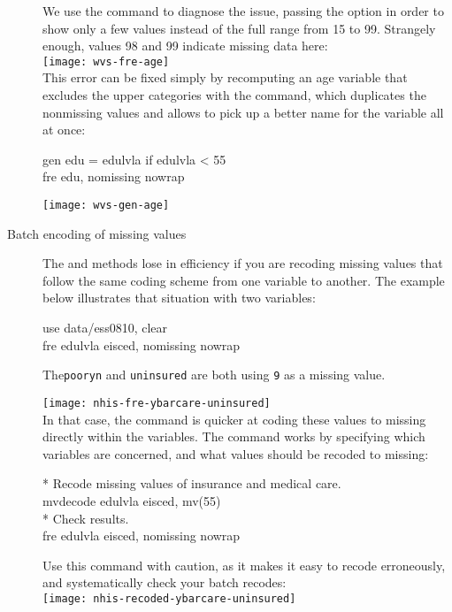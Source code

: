 \begin{description}
	We use the  command to diagnose the issue, passing the  option in order to show only a few values instead of the full range from 15 to 99. Strangely enough, values 98 and 99 indicate missing data here:\\[1em]

		\texttt{[image: wvs-fre-age]}\\[1em]
	
	This error can be fixed simply by recomputing an age variable that excludes the upper categories with the  command, which duplicates the nonmissing values and allows to pick up a better name for the variable all at once:

	\begin{docspec}
		gen edu = edulvla if edulvla < 55\\
		fre edu, nomissing nowrap
	\end{docspec}

\texttt{[image: wvs-gen-age]}\\[1em]

	\item[Batch encoding of missing values]%
	The  and  methods lose in efficiency if you are recoding missing values that follow the same coding scheme from one variable to another. The example below illustrates that situation with two \NHIS variables:\\[1em]

	\begin{docspec}
		use data/ess0810, clear\\
		fre edulvla eisced, nomissing nowrap
	\end{docspec}
	
	The\texttt{pooryn} and \texttt{uninsured} are both using \texttt{9} as a missing value.
	
	\texttt{[image: nhis-fre-ybarcare-uninsured]}\\[1em]

	In that case, the  command is quicker at coding these values to missing directly within the variables. The command works by specifying which variables are concerned, and what values should be recoded to missing:

	\begin{docspec}
		* Recode missing values of insurance and medical care.\\%
		mvdecode edulvla eisced, mv(55)\\[1em]%
		* Check results.\\%
		fre edulvla eisced, nomissing nowrap\\%
	\end{docspec}
	
	Use this command with caution, as it makes it easy to recode erroneously, and systematically check your batch recodes:\\[1em]%

	\texttt{[image: nhis-recoded-ybarcare-uninsured]}
\end{description}


